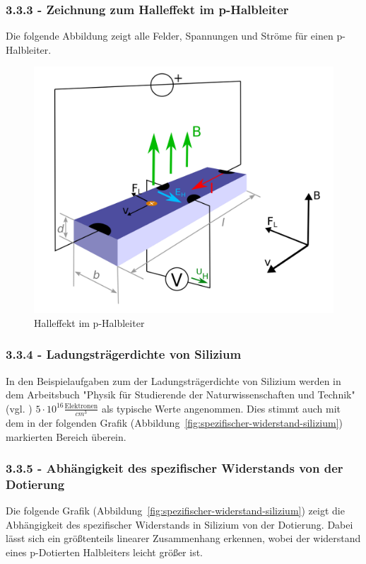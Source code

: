 \documentclass[a4paper]{scrartcl}
\numberwithin{equation}{subsection}
\begin{document}

\subsubsection{3.3.3 - Zeichnung zum Halleffekt im p-Halbleiter}
Die folgende Abbildung zeigt alle Felder, Spannungen und Ströme für einen p-Halbleiter.

\begin{figure}[H]
\includegraphics[width=12cm]{p-Halbleiter_Hall-Effekt}
\centering
\caption{Halleffekt im p-Halbleiter}
\centering
\label{fig:halleffekt-p-halbleiter}
\end{figure}

\subsubsection{3.3.4 - Ladungsträgerdichte von Silizium}
In den Beispielaufgaben zum der Ladungsträgerdichte von Silizium werden in dem Arbeitsbuch "Physik für Studierende der Naturwissenschaften und Technik" (vgl. \cite{tipler}) $5 \cdot 10^{16} \frac{\text{Elektronen}}{cm^3}$ als typische Werte angenommen. Dies stimmt auch mit dem in der folgenden Grafik (Abbildung~\ref{fig:spezifischer-widerstand-silizium}) markierten Bereich überein.

\subsubsection{3.3.5 - Abhängigkeit des spezifischer Widerstands von der Dotierung}
Die folgende Grafik (Abbildung~\ref{fig:spezifischer-widerstand-silizium}) zeigt die Abhängigkeit des spezifischer Widerstands in Silizium von der Dotierung. 
Dabei lässt sich ein größtenteils linearer Zusammenhang erkennen, wobei der widerstand eines p-Dotierten Halbleiters leicht größer ist.
\end{document}
